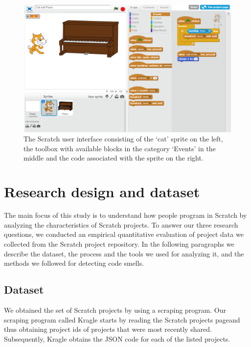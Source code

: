 \documentclass{sig-alternate}
\begin{document}
\begin{figure}
	\begin{center}
		\includegraphics[width=\columnwidth]{fig/ui.png}
		\caption{The Scratch user interface consisting of the `cat' sprite on the left, the toolbox with available blocks in the category `Events' in the middle and the code associated with the sprite on the right.}
		\label{fig:ui}
	\end{center}
\end{figure} 

\section{Research design and dataset}
\label{researchDesign}

The main focus of this study is to understand how people program in Scratch by analyzing the characteristics of Scratch projects. To answer our three research questions, we conducted an empirical quantitative evaluation of project data we collected from the Scratch project repository. In the following paragraphs we describe the dataset, the process and the tools we used for analyzing it, and the methods we followed for detecting code smells.

\subsection{Dataset}
\label{dataset}

We obtained the set of Scratch projects by using a scraping program. Our scraping program called Kragle starts by reading the Scratch projects page\footnotemark[\ref{scratchpublic}] and thus obtaining project ids of projects that were most recently shared. Subsequently, Kragle obtains the JSON code for each of the listed projects. 
\end{document}
